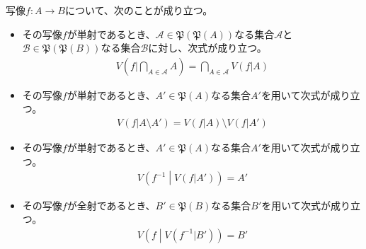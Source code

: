 \documentclass[dvipdfmx]{jsarticle}
\begin{document}
\begin{thm}
\label{1.2.3.9}
写像$f:A \rightarrow B$について、次のことが成り立つ。
\begin{itemize}
\item
  その写像$f$が単射であるとき、$\mathcal{A \in}\mathfrak{P}\left( \mathfrak{P}(A) \right)$なる集合$\mathcal{A}$と$\mathcal{B \in}\mathfrak{P}\left( \mathfrak{P}(B) \right)$なる集合$\mathcal{B}$に対し、次式が成り立つ。
\begin{align*}
V\left( f|\bigcap_{A \in \mathcal{A}} A \right) = \bigcap_{A \in \mathcal{A}} {V\left( f|A \right)}
\end{align*}
\item
  その写像$f$が単射であるとき、$A'\in \mathfrak{P}(A)$なる集合$A'$を用いて次式が成り立つ。
\begin{align*}
V\left( f|A \setminus A' \right) = V\left( f|A \right) \setminus V\left( f|A' \right)
\end{align*}
\item
  その写像$f$が単射であるとき、$A'\in \mathfrak{P}(A)$なる集合$A'$を用いて次式が成り立つ。
\begin{align*}
V\left( f^{- 1} \middle| V\left( f|A' \right) \right) = A'
\end{align*}
\item
  その写像$f$が全射であるとき、$B'\in \mathfrak{P}(B)$なる集合$B'$を用いて次式が成り立つ。
\begin{align*}
V\left( f \middle| V\left( f^{- 1}|B' \right) \right) = B'
\end{align*}
\end{itemize}
\end{thm}
\end{document}
